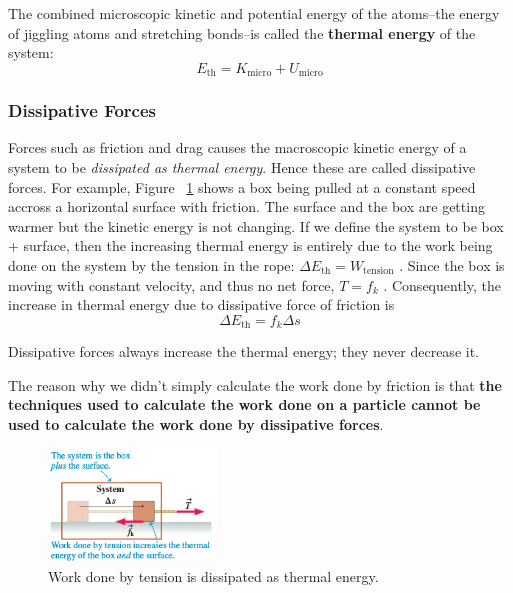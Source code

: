 The combined microscopic kinetic and potential energy of the atoms--the
energy of jiggling atoms and stretching bonds--is called the \textbf{thermal
energy} of the system:
\begin{equation}
    E_\mathrm{th} = K_\mathrm{micro} + U_\mathrm{micro}
\end{equation}

\subsubsection{Dissipative Forces}

Forces such as friction and drag causes the macroscopic kinetic energy
of a system to be \emph{dissipated as thermal energy}.  Hence these are
called dissipative forces.  For example, Figure~%
\ref{fig:dissipated-force-example} shows a box being pulled at a
constant speed accross a horizontal surface with friction.  The surface
and the box are getting warmer but the kinetic energy is not changing.
If we define the system to be box + surface, then the increasing thermal
energy is entirely due to the work being done on the system by the
tension in the rope:
$
    \Delta E_\mathrm{th} = W_\mathrm{tension}
$%
.  Since the box is moving with constant velocity, and thus no net
force,
$
    T = f_k
$%
.  Consequently, the increase in thermal energy due to dissipative force
of friction is
\begin{equation}
    \Delta E_\mathrm{th} = f_k \Delta s
\end{equation}
\begin{remark}
    Dissipative forces always increase the thermal energy; they never
    decrease it.
\end{remark}
The reason why we didn't simply calculate the work done by friction is
that \textbf{the techniques used to calculate the work done on a
particle cannot be used to calculate the work done by dissipative forces}.

\begin{figure}
    \centering
    \includegraphics[width=0.4\textwidth]{../figures/dissipated-force-example.png}
    \caption{Work done by tension is dissipated as thermal energy.}%
    \label{fig:dissipated-force-example}
\end{figure}

